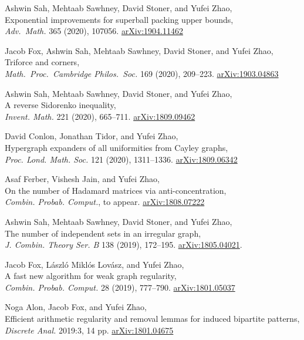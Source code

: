 \documentclass[11pt]{amsart}
\newcommand{\arXiv}[1]{\href{http://arxiv.org/abs/#1}{\color{black!50}\footnotesize\ttfamily  arXiv:#1}}
\renewcommand{\j}[1]{{\frenchspacing\itshape #1}}
\begin{document}
\begin{etaremune}[leftmargin=0.3in,itemsep=4pt,topsep=0pt,partopsep=0pt,parsep=0pt]
\item Ashwin Sah, Mehtaab Sawhney, David Stoner, and Yufei Zhao, \\
	Exponential improvements for superball packing upper bounds, \\
	\j{Adv.~Math.} 365 (2020), 107056.
	\arXiv{1904.11462}

\item Jacob Fox, Ashwin Sah, Mehtaab Sawhney, David Stoner, and Yufei Zhao, \\
	Triforce and corners, \\
	\j{Math.~Proc.~Cambridge Philos.~Soc.} 169 (2020), 209--223. \arXiv{1903.04863}

\item Ashwin Sah, Mehtaab Sawhney, David Stoner, and Yufei Zhao, \\
	A reverse Sidorenko inequality, \\
	\j{Invent. Math.} 221 (2020), 665--711.
	\arXiv{1809.09462}

\item David Conlon, Jonathan Tidor, and Yufei Zhao, \\
	Hypergraph expanders of all uniformities from Cayley graphs, \\
	\j{Proc. Lond. Math. Soc.} 121 (2020), 1311--1336.
	\arXiv{1809.06342}

\item Asaf Ferber, Vishesh Jain, and Yufei Zhao, \\
	On the number of Hadamard matrices via anti-concentration, \\
	\j{Combin. Probab. Comput.}, to appear.
	\arXiv{1808.07222}

\item Ashwin Sah, Mehtaab Sawhney, David Stoner, and Yufei Zhao, \\
The number of independent sets in an irregular graph, \\
	\j{J. Combin. Theory Ser. B} 138 (2019), 172--195. \arXiv{1805.04021}.

\item Jacob Fox, L\'aszl\'o Mikl\'os Lov\'asz, and Yufei Zhao, \\
  A fast new algorithm for weak graph regularity,  \\
  \j{Combin. Probab. Comput.} 28 (2019), 777--790.
  \arXiv{1801.05037}

\item Noga Alon, Jacob Fox, and Yufei Zhao, \\
Efficient arithmetic regularity and removal lemmas for induced bipartite patterns, \\
\j{Discrete Anal.} 2019:3, 14 pp. \arXiv{1801.04675}


\end{etaremune}
\end{document}
